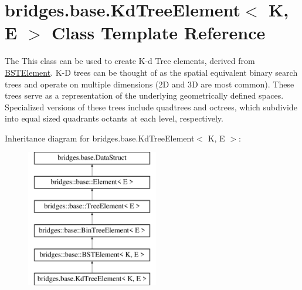 \hypertarget{classbridges_1_1base_1_1_kd_tree_element}{}\section{bridges.\+base.\+Kd\+Tree\+Element$<$ K, E $>$ Class Template Reference}
\label{classbridges_1_1base_1_1_kd_tree_element}


The This class can be used to create K-\/d Tree elements, derived from \mbox{\hyperlink{classbridges_1_1base_1_1_b_s_t_element}{B\+S\+T\+Element}}. K-\/D trees can be thought of as the spatial equivalent binary search trees and operate on multiple dimensions (2D and 3D are most common). These trees serve as a representation of the underlying geometrically defined spaces. Specialized versions of these trees include quadtrees and octrees, which subdivide into equal sized quadrants octants at each level, respectively.  


Inheritance diagram for bridges.\+base.\+Kd\+Tree\+Element$<$ K, E $>$\+:\begin{figure}[H]
\begin{center}
\leavevmode
\includegraphics[height=6.000000cm]{classbridges_1_1base_1_1_kd_tree_element}
\end{center}
\end{figure}
